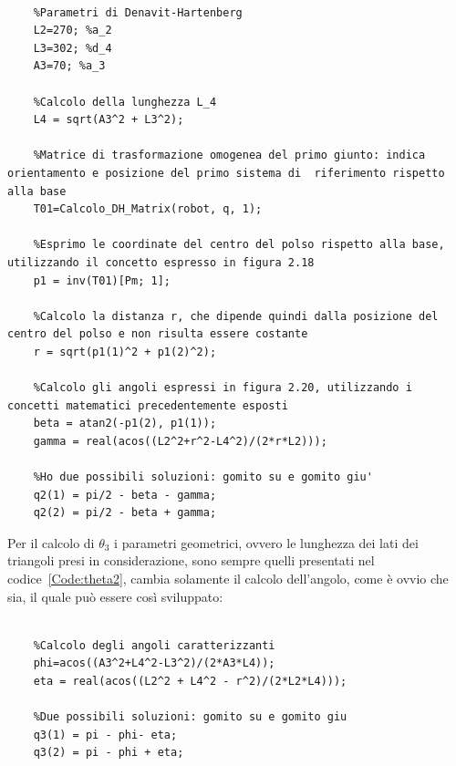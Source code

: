 \begin{lstlisting}[style=Matlab-editor,caption=Calcolo del parametro di giunto $\theta_2$,captionpos=b,label={Code:theta2}, basicstyle=\footnotesize\ttfamily,frame=trBL]

	%Parametri di Denavit-Hartenberg
	L2=270; %a_2
	L3=302; %d_4
	A3=70; %a_3	
	
	%Calcolo della lunghezza L_4
	L4 = sqrt(A3^2 + L3^2);

	%Matrice di trasformazione omogenea del primo giunto: indica orientamento e posizione del primo sistema di  riferimento rispetto alla base
	T01=Calcolo_DH_Matrix(robot, q, 1);	
	
	%Esprimo le coordinate del centro del polso rispetto alla base, utilizzando il concetto espresso in figura 2.18
	p1 = inv(T01)[Pm; 1];
	
	%Calcolo la distanza r, che dipende quindi dalla posizione del centro del polso e non risulta essere costante
	r = sqrt(p1(1)^2 + p1(2)^2);
	
	%Calcolo gli angoli espressi in figura 2.20, utilizzando i concetti matematici precedentemente esposti
	beta = atan2(-p1(2), p1(1));
	gamma = real(acos((L2^2+r^2-L4^2)/(2*r*L2)));	
	
	%Ho due possibili soluzioni: gomito su e gomito giu'
	q2(1) = pi/2 - beta - gamma;
	q2(2) = pi/2 - beta + gamma;
\end{lstlisting}




Per il calcolo di $\theta_3$ i parametri geometrici, ovvero le lunghezza dei lati dei triangoli presi in considerazione, sono sempre quelli presentati nel codice~\vref{Code:theta2}, cambia solamente il calcolo dell'angolo, come è ovvio che sia, il quale può essere così sviluppato:

\begin{lstlisting}[style=Matlab-editor,caption=Calcolo del parametro di giunto $\theta_3$,captionpos=b,label={Code:theta3}, basicstyle=\footnotesize\ttfamily,frame=trBL]

	%Calcolo degli angoli caratterizzanti
	phi=acos((A3^2+L4^2-L3^2)/(2*A3*L4));
	eta = real(acos((L2^2 + L4^2 - r^2)/(2*L2*L4)));
	
	%Due possibili soluzioni: gomito su e gomito giu
	q3(1) = pi - phi- eta; 
	q3(2) = pi - phi + eta; 
\end{lstlisting}



